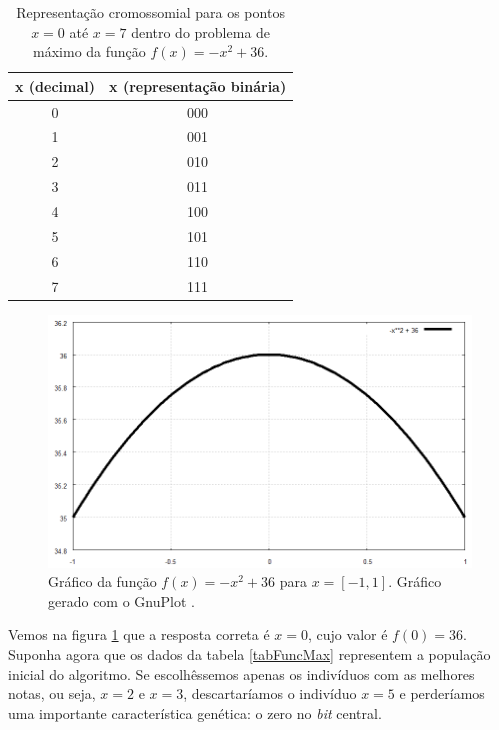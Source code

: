 	\begin{table}[htp]
 		\caption{\label{tabRepCroX2}Representação cromossomial para os pontos $x = 0$ até $x = 7$ dentro do problema de máximo da função $f(x) = -x^2 + 36$.}
 		\begin{center}
  		\begin{tabular}{c|c}
   			\hline
   			\textbf{x (decimal)}  & \textbf{x (representação binária)} \\
   			\hline
   			0 & 000 \\
   			1 & 001 \\
   			2 & 010 \\ 
   			3 & 011 \\
   			4 & 100 \\
   			5 & 101 \\ 
   			6 & 110 \\
   			7 & 111	\\
   			\hline
   		\end{tabular}
 		\end{center}
	\end{table}
	
	\begin{figure}[htp]
		\begin{center}
			\includegraphics[width=13cm]{figs/ga/Parabola.png}
		\end{center}
		\caption{\label{figParabola}Gráfico da função $f(x) = -x^2 + 36$ para $x = [-1,1]$. Gráfico gerado com o GnuPlot \cite{gnuplot}.}
	\end{figure}
	
	 Vemos na figura \ref{figParabola} que a resposta correta é $x = 0$, cujo valor é $f(0) = 36$. Suponha agora que os dados da tabela \ref{tabFuncMax} representem a população inicial do algoritmo. Se escolhêssemos apenas os indivíduos com as melhores notas, ou seja, $x = 2$ e $x = 3$, descartaríamos o indivíduo $x = 5$ e perderíamos uma importante característica genética: o zero no \textit{bit} central.
	 
